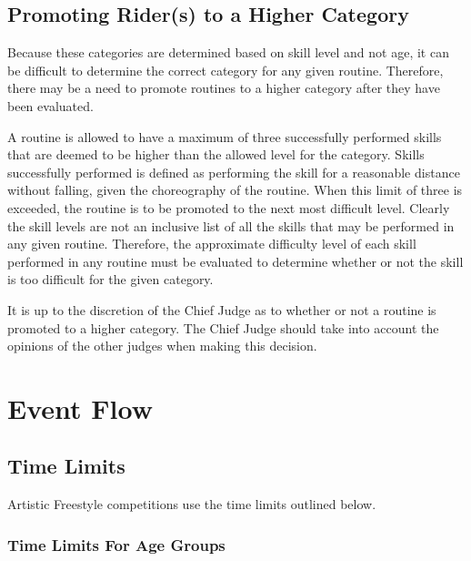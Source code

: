 \subsection{Promoting Rider(s) to a Higher Category}
Because these categories are determined based on skill level and not age, it can be difficult to determine the correct category for any given routine.
Therefore, there may be a need to promote routines to a higher category after they have been evaluated.

A routine is allowed to have a maximum of three successfully performed skills that are deemed to be higher than the allowed level for the category.
Skills successfully performed is defined as performing the skill for a reasonable distance without falling, given the choreography of the routine.
When this limit of three is exceeded, the routine is to be promoted to the next most difficult level.
Clearly the skill levels are not an inclusive list of all the skills that may be performed in any given routine.
Therefore, the approximate difficulty level of each skill performed in any routine must be evaluated to determine whether or not the skill is too difficult for the given category.

It is up to the discretion of the Chief Judge as to whether or not a routine is promoted to a higher category.
The Chief Judge should take into account the opinions of the other judges when making this decision.

\section{Event Flow}

\subsection{Time Limits}

Artistic Freestyle competitions use the time limits outlined below.

\subsubsection{Time Limits For Age Groups}

